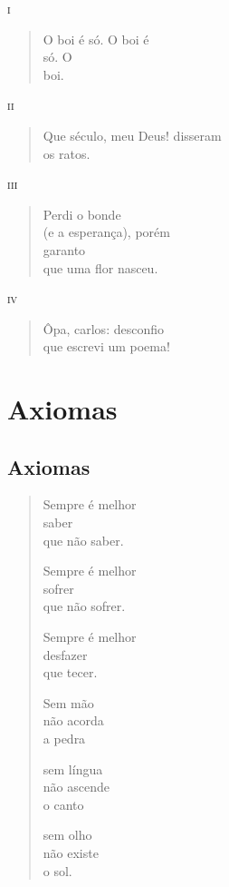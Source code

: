 \forceindent\textsc{i}

\begin{verse}
O boi é só. O boi é\\
só. O\\
boi.
\end{verse}

\medskip
\textsc{ii}

\begin{verse}
Que século, meu Deus! disseram\\
os ratos.
\end{verse}

\medskip
\textsc{iii}

\begin{verse}
Perdi o bonde\\
(e a esperança), porém\\
garanto\\
que uma flor nasceu.
\end{verse}

\medskip
\textsc{iv}

\begin{verse}
Ôpa, carlos: desconfio\\
que escrevi um poema!
\end{verse}

\part*{Axiomas}

\chapter{Axiomas}

\begin{verse}
Sempre é melhor\\
saber\\
\qquad que não saber.

\qquad Sempre é melhor\\
\qquad sofrer\\
\qquad que não sofrer.

\qquad Sempre é melhor\\
\qquad desfazer\\
\qquad que tecer.

\qquad Sem mão\\
\qquad não acorda\\
\qquad a pedra

\qquad sem língua\\
\qquad não ascende\\
\qquad o canto

\qquad sem olho\\
\qquad não existe\\
\qquad o sol.
\end{verse}


